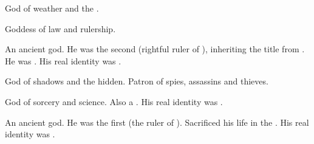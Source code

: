   
\begin{gloss}
  \begin{comment}
  \subparagraph{Daxian}
  \end{comment}
  God of weather and the \Wylde{}. 



  \begin{comment}
  \subparagraph{Ishcatla}
  \end{comment}
  
  
  
  \begin{comment}
  \subparagraph{Isxae}
  \end{comment}
  Goddess of law and rulership. 
  
  
  
  \begin{comment}
  \subparagraph{\Mezzagrael}
  \end{comment}
  \gitemlink[Mezzagrael]{\Mezzagrael}
  \index{\Mezzagrael}
  An ancient god. 
  He was the second \Nechsain (rightful ruler of \Miith), inheriting the title from . 
  He was .
  His real identity was .  
  
  
  
  \begin{comment}
  \subparagraph{\Nasshikerr}
  \end{comment}
  \gitemlink[Nasshikerr]{\Nasshikerr}
  \index{\Nasshikerr}
  God of shadows and the hidden. 
  Patron of spies, assassins and thieves. 
  
  
  
  \begin{comment}
  \subparagraph{Rissit}
  \end{comment}
  God of sorcery and science. 
  Also a .
  His real identity was . 
  
  
  
  \begin{comment}
  \subparagraph{\Settras}
  \end{comment}
  \gitemlink[Settras]{\Settras}
  \index{\Settras}
  An ancient god. 
  He was the first \Nechsain (the ruler of \Miith).
  Sacrificed his life in the . 
  His real identity was . 
  

\end{gloss}
